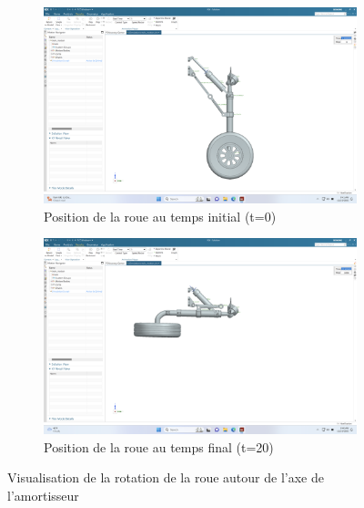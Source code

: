 \documentclass{article}
\begin{document}
\begin{figure}[h]
    \centering
    \begin{subfigure}[h]{0.48\textwidth}
        \includegraphics[width=\textwidth]{pics/wheel_down_t0.png}
        \caption{Position de la roue au temps initial (t=0)}
        \label{fig:wheel_down_t0}
    \end{subfigure}
    \hfill
    \begin{subfigure}[h]{0.48\textwidth}
        \includegraphics[width=\textwidth]{pics/wheel_up_t20.png}
        \caption{Position de la roue au temps final (t=20)}
        \label{fig:wheel_up_t20}
    \end{subfigure}
    \caption{Visualisation de la rotation de la roue autour de l'axe de l'amortisseur}
    \label{fig:wheel_rotation}
\end{figure}
\end{document}
